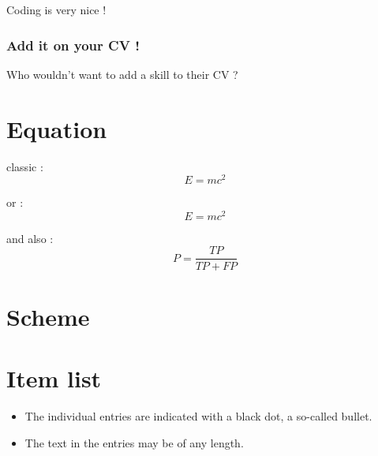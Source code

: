 \documentclass[hidelinks,11pt,a4paper]{report}
\begin{document}
Coding is very nice !

\subsubsection{Add it on your CV !}

Who wouldn't want to add a skill to their CV ? 

\section{Equation}


classic : %
\begin{equation}
E = mc^2
\end{equation}

or : %
\[
E = mc^2
\]

and also : %
\begin{equation}
P = \frac{TP}{TP + FP}
\end{equation}

\section{Scheme}




\section{Item list}

\begin{itemize}
  \item The individual entries are indicated with a black dot, a so-called bullet.
  \item The text in the entries may be of any length.
\end{itemize}
\end{document}
